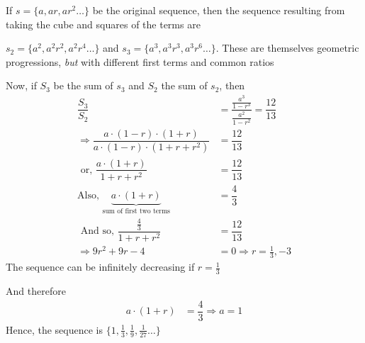 \begin{solution}[\halfpage]
   If $s = \lbrace a, ar, ar^2 \ldots\rbrace$ be the original sequence, then the sequence
   resulting from taking the cube and squares of the terms are
   
   $s_2 = \lbrace a^2, a^2r^2,a^2r^4 \ldots \rbrace$ and $ s_3 = \lbrace a^3, a^3r^3, a^3r^6 \ldots \rbrace$.
   These are themselves geometric progressions, \textit{but} with different first terms and common ratios
   
   Now, if $S_3$ be the sum of $s_3$ and $S_2$ the sum of $s_2$, then
   \begin{align}
   		\dfrac{S_3}{S_2} &= \dfrac{\frac{a^3}{1-r^3}}{\frac{a^2}{1-r^2}} = \dfrac{12}{13} \\
   		\Rightarrow \dfrac{a\cdot(1-r)\cdot(1+r)}{a\cdot(1-r)\cdot(1+r+r^2)} &= \dfrac{12}{13} \\
   		\text{ or, } \dfrac{a\cdot(1+r)}{1+r+r^2} &= \dfrac{12}{13} \\
   		\text{Also, } \underbrace{a\cdot(1+r)}_{\text{sum of first two terms}} &= \dfrac{4}{3} \\
   		\text{ And so, } \dfrac{\frac{4}{3}}{1+r+r^2} &= \dfrac{12}{13} \\
   		\Rightarrow 9r^2 + 9r - 4 &= 0 \Rightarrow r = \frac{1}{3}, -3
   \end{align}
   The sequence can be infinitely decreasing if $r = \frac{1}{3}$
   
   And therefore 
   \begin{align}
   	a\cdot(1+r) &= \dfrac{4}{3} \Rightarrow a = 1
   \end{align}
   Hence, the sequence is $\lbrace 1, \frac{1}{3}, \frac{1}{9}, \frac{1}{27} \ldots\rbrace$
\end{solution}
